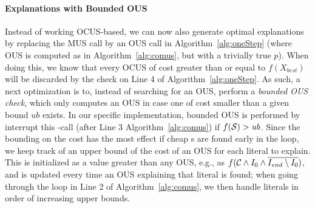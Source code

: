 \paragraph{Explanations with Bounded OUS}
Instead of working OCUS-based, we can now also generate optimal explanations by replacing the MUS call by an OUS call  in Algorithm~\ref{alg:oneStep} (where OUS is computed as in Algorithm~\ref{alg:comus}, but with a trivially true $p$). 
When doing this, we know that every OCUS of cost greater than or equal to $f(X_{\mathit{best}})$ will be discarded by the check on Line 4 of Algorithm~\ref{alg:oneStep}.
As such, a next optimization is to, instead of searching for an OUS, perform a \emph{bounded OUS check}, which only computes an OUS in case one of cost smaller than a given bound $\mathit{ub}$ exists.  
In our specific implementation, bounded OUS is performed by interrupt this \omus-call (after Line 3 Algorithm~\ref{alg:comus}) if $f(\mathcal{S}) > \mathit{ub}$.
Since the bounding on the \omus cost has the most effect if cheap \omus{}s are found early in the loop, we keep track of an upper bound of the cost of an OUS for each literal to explain. This is initialized as a value greater than any OUS, e.g., as $f(\mathcal{C}  \land I_0 \land \overline{I_\mathit{end}  \setminus I_0})$, and is updated every time an OUS explaining that literal is found; when going through the loop in Line 2 of Algorithm~\ref{alg:comus}, we then handle literals in order of increasing upper bounds.





